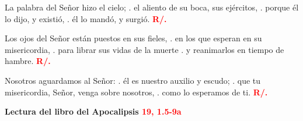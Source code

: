 \documentclass[12pt, letterpaper, spanish]{report}
\begin{document}
\hspace{2cm} La palabra del Se\~nor hizo el cielo; \newline
. \hspace{2.5cm} el aliento de su boca, sus ej\'ercitos, \newline
. \hspace{2.5cm} porque \'el lo dijo, y existi\'o, \newline
. \hspace{2.5cm} \'el lo mand\'o, y surgi\'o. \hspace{1cm} {\bfseries \textcolor{red}{R/.}} \newline

\hspace{2cm} Los ojos del Se\~nor est\'an puestos en sus fieles, \newline
. \hspace{2.5cm}  en los que esperan en su misericordia, \newline
. \hspace{2.5cm}  para librar sus vidas de la muerte \newline
. \hspace{2.5cm}  y reanimarlos en tiempo de hambre. \hspace{1cm} {\bfseries \textcolor{red}{R/.}} \newline

\hspace{2cm} Nosotros aguardamos al Se\~nor: \newline
. \hspace{2.5cm}  \'el es nuestro auxilio y escudo; \newline
. \hspace{2.5cm}  que tu misericordia, Se\~nor, venga sobre nosotros, \newline
. \hspace{2.5cm}  como lo esperamos de ti. \hspace{1cm} {\bfseries \textcolor{red}{R/.}} \newline

\newpage

\Large {\bfseries Lectura del libro del Apocalipsis \hspace{1cm} \textcolor{red}{19, 1.5-9a}} \newline 
\end{document}
